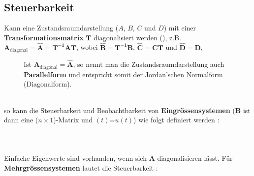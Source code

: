 {\subsection{Steuerbarkeit}
Kann eine Zustandsraumdarstellung ({\boldmath $A$, $B$, $C$} und  {\boldmath $D$}) mit einer {\bf Transformationsmatrix}
$\boldsymbol{T}$ diagonalisiert werden (), z.B. $\boldsymbol{A}_\text{diagonal}=\boldsymbol{\hat{A}}=\boldsymbol{T^{-1}AT}$, wobei $\boldsymbol{\hat{B}}=\boldsymbol{T^{-1}B}$, $\boldsymbol{\hat{C}}=\boldsymbol{CT}$ und  $\boldsymbol{\hat{D}}=\boldsymbol{D}$, \\
\begin{figure}[!htb]
\vspace*{-4mm}\begin{center}
  \vspace*{-3mm}\caption{Ist $\boldsymbol{A}_\text{diagonal}=\boldsymbol{\hat{A}}$, so nennt man die Zustandsraumdarstellung auch {\bf Parallelform} \cite{GIR:RAB:STE:05} und entspricht somit der Jordan'schen Normalform (Diagonalform).}
\end{center}
\vspace*{-6mm}
\end{figure}\\
so kann die Steuerbarkeit und Beobachtbarkeit von {\bf Eingr\"ossensystemen} ($\boldsymbol{B}$ ist dann eine ($n\times 1$)-Matrix und $(t)$=$u(t)$) wie folgt definiert werden \cite{GIR:RAB:STE:05, UNB:89}:\\~\\
\\~\\
Einfache Eigenwerte sind vorhanden, wenn
    sich $\boldsymbol{A}$ diagonalisieren l\"asst. F\"ur  {\bf Mehrgr\"ossensystemen} lautet die Steuerbarkeit \cite{UNB:89}:\\~\\
}
